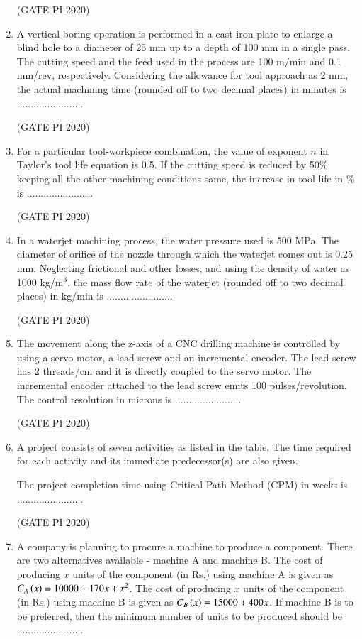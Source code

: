 \documentclass[journal,12pt,onecolumn]{IEEEtran}
\theoremstyle{remark}
\begin{document}
\begin{enumerate}
\hfill (GATE PI 2020)

\item A vertical boring operation is performed in a cast iron plate to enlarge a blind hole to a diameter of 25 mm up to a depth of 100 mm in a single pass. The cutting speed and the feed used in the process are 100 m/min and 0.1 mm/rev, respectively. Considering the allowance for tool approach as 2 mm, the actual machining time (rounded off to two decimal places) in minutes is ........................

\hfill (GATE PI 2020)

\item For a particular tool\--workpiece combination, the value of exponent $n$ in Taylor's tool life equation is 0.5. If the cutting speed is reduced by 50\% keeping all the other machining conditions same, the increase in tool life in \% is ........................

\hfill (GATE PI 2020)

\item In a waterjet machining process, the water pressure used is 500 MPa. The diameter of orifice of the nozzle through which the waterjet comes out is 0.25 mm. Neglecting frictional and other losses, and using the density of water as 1000 kg/m$^3$, the mass flow rate of the waterjet (rounded off to two decimal places) in kg/min is ........................

\hfill (GATE PI 2020)

\item The movement along the z-axis of a CNC drilling machine is controlled by using a servo motor, a lead screw and an incremental encoder. The lead screw has 2 threads/cm and it is directly coupled to the servo motor. The incremental encoder attached to the lead screw emits 100 pulses/revolution. The control resolution in microns is ........................

\hfill (GATE PI 2020)

\item A project consists of seven activities as listed in the table. The time required for each activity and its immediate predecessor(s) are also given.



The project completion time using Critical Path Method (CPM) in weeks is ........................

\hfill (GATE PI 2020)
\item A company is planning to procure a machine to produce a component. There are two alternatives available - machine A and machine B. The cost of producing $x$ units of the component (in Rs.) using machine A is given as $C_A\left(x\right) = 10000 + 170x + x^2$. The cost of producing $x$ units of the component (in Rs.) using machine B is given as $C_B\left(x\right) = 15000 + 400x$. If machine B is to be preferred, then the minimum number of units to be produced should be ........................


\end{enumerate}
\end{document}
